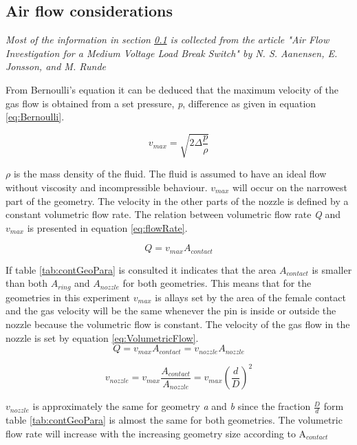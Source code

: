 \documentclass[10pt,a4paper]{article} %
\begin{document}
\subsection{Air flow considerations} \label{sec:AirFlow}
\textit{ Most of the information in section \ref{sec:AirFlow} is collected from the article "Air Flow Investigation for a Medium Voltage Load Break Switch" by N. S. Aanensen, E. Jonsson, and M. Runde} \newline

From Bernoulli's equation it can be deduced that the maximum velocity of the gas flow is obtained from a set pressure, \textit{p}, difference as given in equation \eqref{eq:Bernoulli}.

\begin{equation} \label{eq:Bernoulli}
v_{max}=\sqrt{2 \Delta \frac{p}{\rho}}
\end{equation}

$\rho$ is the mass density of the fluid. The fluid is assumed to have an ideal flow without viscosity and incompressible behaviour. $v_{max}$ will occur on the narrowest part of the geometry. The velocity in the other parts of the nozzle is defined by a constant volumetric flow rate. The relation between volumetric flow rate \textit{Q} and $v_{max}$ is presented in equation \eqref{eq:flowRate}.

\begin{equation} \label{eq:flowRate}
Q=v_{max} A_{contact}
\end{equation} 

If table \ref{tab:contGeoPara} is consulted it indicates that the area $A_{contact}$ is smaller than both $A_{ring}$ and $A_{nozzle}$ for both geometries. This means that for the geometries in this experiment $v_{max}$ is allays set by the area of the female contact and the gas velocity will be the same whenever the pin is inside or outside the nozzle because the volumetric flow is constant. The velocity of the gas flow in the nozzle is set by equation \eqref{eq:VolumetricFlow}.
\begin{equation*}
Q=v_{max} A_{contact} = v_{nozzle} A_{nozzle}
\end{equation*}


\begin{equation} \label{eq:VolumetricFlow}
v_{nozzle}= v_{max}\frac{A_{contact}}{A_{nozzle} }= v_{max} (\frac{d}{D})^2
\end{equation} 

$v_{nozzle}$ is approximately the same for geometry \textit{a} and \textit{b} since the fraction $\frac{D}{d}$ form table \ref{tab:contGeoPara} is almost the same for both geometries. The volumetric flow rate will increase with the increasing geometry size according to A$_{contact}$
\end{document}

